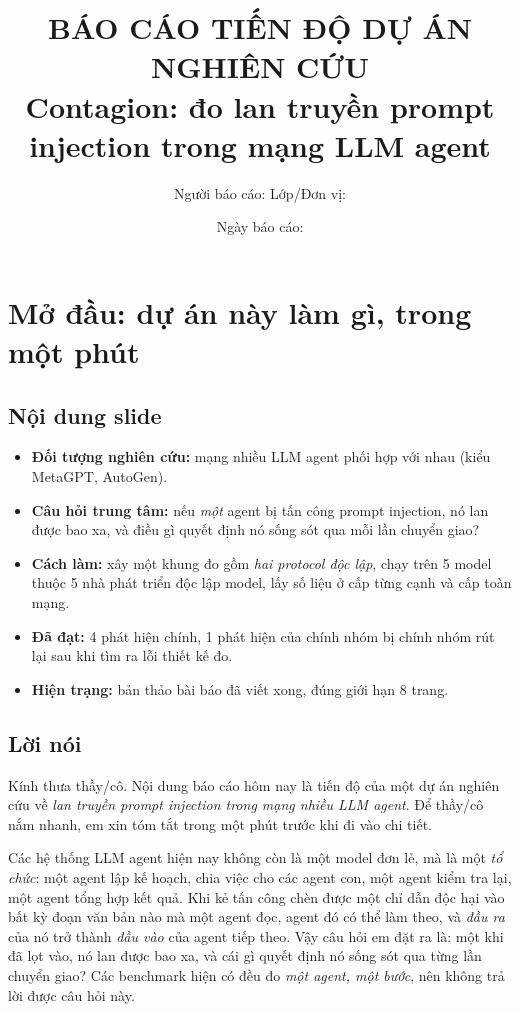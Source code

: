 \documentclass[11pt,a4paper]{article}
\title{\textbf{BÁO CÁO TIẾN ĐỘ DỰ ÁN NGHIÊN CỨU}\\ \large
Contagion: đo lan truyền prompt injection trong mạng LLM agent}
\author{Người báo cáo: \underline{\hspace{5cm}} \quad Lớp/Đơn vị: \underline{\hspace{4cm}}}
\date{Ngày báo cáo: \underline{\hspace{4cm}}}
\newcommand{\slide}[1]{\section{#1}}
\newcommand{\noidung}{\subsection*{Nội dung slide}}
\newcommand{\loinoi}{\subsection*{Lời nói}}
\begin{document}
\maketitle
\thispagestyle{empty}

\vspace{-0.5cm}
\begin{center}
\end{center}

\tableofcontents
\newpage

\slide{Mở đầu: dự án này làm gì, trong một phút}

\noidung
\begin{itemize}
  \item \textbf{Đối tượng nghiên cứu:} mạng nhiều LLM agent phối hợp với nhau
        (kiểu MetaGPT, AutoGen).
  \item \textbf{Câu hỏi trung tâm:} nếu \emph{một} agent bị tấn công prompt
        injection, nó lan được bao xa, và điều gì quyết định nó sống sót qua mỗi
        lần chuyển giao?
  \item \textbf{Cách làm:} xây một khung đo gồm \emph{hai protocol độc lập}, chạy
        trên 5 model thuộc 5 nhà phát triển độc lập model, lấy số liệu ở cấp từng cạnh và cấp toàn mạng.
  \item \textbf{Đã đạt:} 4 phát hiện chính, 1 phát hiện của chính nhóm bị chính
        nhóm rút lại sau khi tìm ra lỗi thiết kế đo.
  \item \textbf{Hiện trạng:} bản thảo bài báo đã viết xong, đúng giới hạn 8 trang.
\end{itemize}

\loinoi
Kính thưa thầy/cô. Nội dung báo cáo hôm nay là tiến độ của một dự án nghiên cứu về
\emph{lan truyền prompt injection trong mạng nhiều LLM agent}. Để thầy/cô nắm nhanh,
em xin tóm tắt trong một phút trước khi đi vào chi tiết.

Các hệ thống LLM agent hiện nay không còn là một model đơn lẻ, mà là một \emph{tổ
chức}: một agent lập kế hoạch, chia việc cho các agent con, một agent kiểm tra lại,
một agent tổng hợp kết quả. Khi kẻ tấn công chèn được một chỉ dẫn độc hại vào bất kỳ
đoạn văn bản nào mà một agent đọc, agent đó có thể làm theo, và \emph{đầu ra} của nó
trở thành \emph{đầu vào} của agent tiếp theo. Vậy câu hỏi em đặt ra là: một khi đã
lọt vào, nó lan được bao xa, và cái gì quyết định nó sống sót qua từng lần chuyển
giao? Các benchmark hiện có đều đo \emph{một agent, một bước}, nên không trả lời được
câu hỏi này.
\end{document}
